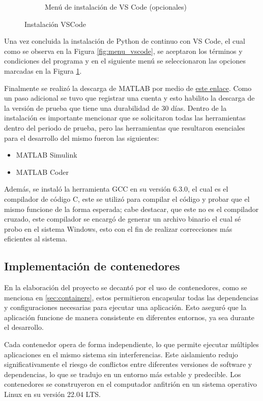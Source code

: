 \begin{figure}[htbp]
\begin{subfigure}[b]{0.45\textwidth}
        \caption{Menú de instalación de VS Code (opcionales)}
        \label{fig:menu_vscode_adicionales}
    \end{subfigure}
    \caption{Instalación VSCode}
    \label{fig:menu_vscode_2}
\end{figure}


Una vez concluida la instalación de Python de continuo con VS Code, el cual como se observa en la Figura \ref{fig:menu_vscode}, se aceptaron los términos y condiciones del programa y en el siguiente menú se seleccionaron las opciones marcadas en la Figura \ref{fig:menu_vscode_adicionales}.

Finalmente se realizó la descarga de MATLAB  por medio de \href{https://matlab.mathworks.com/}{este enlace}. Como un paso adicional se tuvo que registrar una cuenta y esto habilito la descarga de la versión de prueba que tiene una durabilidad de 30 días. Dentro de la instalación es importante mencionar que se solicitaron todas las herramientas dentro del periodo de prueba, pero las herramientas que resultaron esenciales para el desarrollo del mismo fueron las siguientes:

\begin{itemize}
    \item MATLAB Simulink
    \item MATLAB Coder
\end{itemize}

Además, se instaló la herramienta GCC en su versión 6.3.0, el cual es el compilador de código C, este se utilizó para compilar el código y probar que el mismo funcione de la forma esperada; cabe destacar, que este no es el compilador cruzado, este compilador se encargó de generar un archivo binario el cual sé probo en el sistema Windows, esto con el fin de realizar correcciones más eficientes al sistema.

\subsection{Implementación de contenedores}\label{sec:entorno_en_contenedores}

En la elaboración del proyecto se decantó por el uso de contenedores, como se menciona en \ref{sec:containers}, estos permitieron encapsular todas las dependencias y configuraciones necesarias para ejecutar una aplicación. Esto aseguró que la aplicación funcione de manera consistente en diferentes entornos, ya sea durante el desarrollo. 

Cada contenedor opera de forma independiente, lo que permite ejecutar múltiples aplicaciones en el mismo sistema sin interferencias. Este aislamiento redujo significativamente el riesgo de conflictos entre diferentes versiones de software y dependencias, lo que se tradujo en un entorno más estable y predecible. Los contenedores se construyeron en el computador anfitrión en un sistema operativo Linux en su versión 22.04 LTS.

